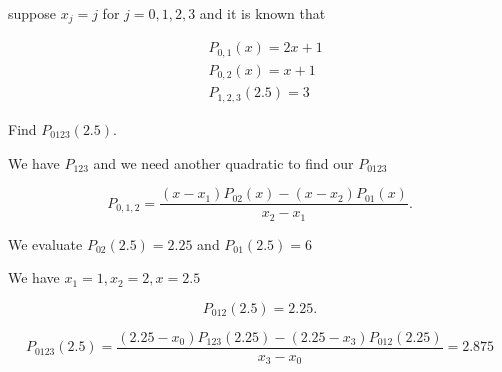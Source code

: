 \Ex suppose $x_j = j$ for $j=0,1,2,3$ and it is known that 

\begin{align*}
  &P_{0,1}(x) = 2x+1 \\
  &P_{0,2}(x) = x+1 \\
  &P_{1,2,3}(2.5) = 3
\end{align*}

Find $P_{0123}(2.5)$.

We have $P_{123}$ and we need another quadratic to find our $P_{0123}$

\[
P_{0,1,2} = \frac{(x-x_1)P_{02} (x) - (x-x_2) P_{01}(x)}{x_2 - x_1}
.\]

We evaluate $P_{02}(2.5) = 2.25$ and $P_{01}(2.5) = 6$

We have $x_1 = 1, x_2 = 2, x=2.5$

\[
  P_{012}(2.5) = 2.25 
.\]

\[
  P_{0123}(2.5) = \frac{(2.25-x_0)P_{123}(2.25) - (2.25-x_3)P_{012}(2.25)}{x_3 -
  x_0} = 2.875
\]

